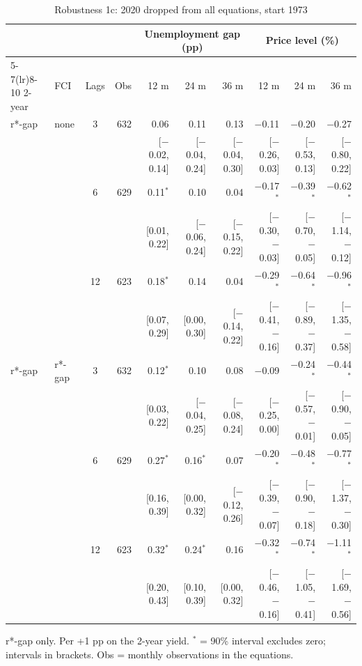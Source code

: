 \begin{table}[p]\centering\footnotesize\setlength{\tabcolsep}{2.2pt}
\caption{Robustness 1c: 2020 dropped from all equations, start 1973}\label{tab:R1c}
\begin{tabular}{llcrrrrrrr}\toprule
 & & & & \multicolumn{3}{c}{Unemployment gap (pp)} & \multicolumn{3}{c}{Price level (\%)}\\ \cmidrule(lr){5-7}\cmidrule(lr){8-10}
2-year & FCI & Lags & Obs & 12 m & 24 m & 36 m & 12 m & 24 m & 36 m\\ \midrule
r*-gap & none & 3 & 632 & 0.06 & 0.11 & 0.13 & $-$0.11 & $-$0.20 & $-$0.27\\
 & & & & {\scriptsize [$-$0.02, 0.14]} & {\scriptsize [$-$0.04, 0.24]} & {\scriptsize [$-$0.04, 0.30]} & {\scriptsize [$-$0.26, 0.03]} & {\scriptsize [$-$0.53, 0.13]} & {\scriptsize [$-$0.80, 0.22]}\\
 &  & 6 & 629 & 0.11$^{*}$ & 0.10 & 0.04 & $-$0.17$^{*}$ & $-$0.39$^{*}$ & $-$0.62$^{*}$\\
 & & & & {\scriptsize [0.01, 0.22]} & {\scriptsize [$-$0.06, 0.24]} & {\scriptsize [$-$0.15, 0.22]} & {\scriptsize [$-$0.30, $-$0.03]} & {\scriptsize [$-$0.70, $-$0.05]} & {\scriptsize [$-$1.14, $-$0.12]}\\
 &  & 12 & 623 & 0.18$^{*}$ & 0.14 & 0.04 & $-$0.29$^{*}$ & $-$0.64$^{*}$ & $-$0.96$^{*}$\\
 & & & & {\scriptsize [0.07, 0.29]} & {\scriptsize [0.00, 0.30]} & {\scriptsize [$-$0.14, 0.22]} & {\scriptsize [$-$0.41, $-$0.16]} & {\scriptsize [$-$0.89, $-$0.37]} & {\scriptsize [$-$1.35, $-$0.58]}\\
r*-gap & r*-gap & 3 & 632 & 0.12$^{*}$ & 0.10 & 0.08 & $-$0.09 & $-$0.24$^{*}$ & $-$0.44$^{*}$\\
 & & & & {\scriptsize [0.03, 0.22]} & {\scriptsize [$-$0.04, 0.25]} & {\scriptsize [$-$0.08, 0.24]} & {\scriptsize [$-$0.25, 0.00]} & {\scriptsize [$-$0.57, $-$0.01]} & {\scriptsize [$-$0.90, $-$0.05]}\\
 &  & 6 & 629 & 0.27$^{*}$ & 0.16$^{*}$ & 0.07 & $-$0.20$^{*}$ & $-$0.48$^{*}$ & $-$0.77$^{*}$\\
 & & & & {\scriptsize [0.16, 0.39]} & {\scriptsize [0.00, 0.32]} & {\scriptsize [$-$0.12, 0.26]} & {\scriptsize [$-$0.39, $-$0.07]} & {\scriptsize [$-$0.90, $-$0.18]} & {\scriptsize [$-$1.37, $-$0.30]}\\
 &  & 12 & 623 & 0.32$^{*}$ & 0.24$^{*}$ & 0.16 & $-$0.32$^{*}$ & $-$0.74$^{*}$ & $-$1.11$^{*}$\\
 & & & & {\scriptsize [0.20, 0.43]} & {\scriptsize [0.10, 0.39]} & {\scriptsize [0.00, 0.32]} & {\scriptsize [$-$0.46, $-$0.16]} & {\scriptsize [$-$1.05, $-$0.41]} & {\scriptsize [$-$1.69, $-$0.56]}\\
\bottomrule\end{tabular}
\par\smallskip\parbox{0.96\linewidth}{\scriptsize r*-gap only. Per +1 pp on the 2-year yield. $^{*}$ = 90\% interval excludes zero; intervals in brackets. Obs = monthly observations in the equations.}
\end{table}
